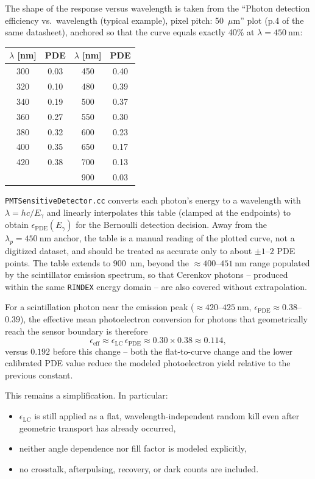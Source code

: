 The shape of the response versus wavelength is taken from the ``Photon
detection efficiency vs.\ wavelength (typical example), pixel pitch:
50~$\mu$m'' plot (p.4 of the same datasheet), anchored so that the curve
equals exactly 40\% at $\lambda = 450~\mathrm{nm}$:
\begin{center}
\begin{tabular}{cccc}
\toprule
$\lambda$ [nm] & PDE & $\lambda$ [nm] & PDE \\
\midrule
300 & 0.03 & 450 & 0.40 \\
320 & 0.10 & 480 & 0.39 \\
340 & 0.19 & 500 & 0.37 \\
360 & 0.27 & 550 & 0.30 \\
380 & 0.32 & 600 & 0.23 \\
400 & 0.35 & 650 & 0.17 \\
420 & 0.38 & 700 & 0.13 \\
& & 900 & 0.03 \\
\bottomrule
\end{tabular}
\end{center}
\texttt{PMTSensitiveDetector.cc} converts each photon's energy to a
wavelength with $\lambda = hc/E_\gamma$ and linearly interpolates this
table (clamped at the endpoints) to obtain $\epsilon_\mathrm{PDE}(E_\gamma)$
for the Bernoulli detection decision. Away from the $\lambda_p=450~\mathrm{nm}$
anchor, the table is a manual reading of the plotted curve, not a digitized
dataset, and should be treated as accurate only to about $\pm 1$--$2$ PDE
points. The table extends to 900~nm, beyond the
$\approx 400$--$451~\mathrm{nm}$ range populated by the scintillator
emission spectrum, so that Cerenkov photons -- produced within the same
\texttt{RINDEX} energy domain -- are also covered without extrapolation.

For a scintillation photon near the emission peak ($\approx 420$--$425~\mathrm{nm}$,
$\epsilon_\mathrm{PDE}\approx 0.38$--$0.39$), the effective mean
photoelectron conversion for photons that geometrically reach the sensor
boundary is therefore
\[
\epsilon_\mathrm{eff} \approx \epsilon_\mathrm{LC}\,\epsilon_\mathrm{PDE}
\approx 0.30 \times 0.38 \approx 0.114,
\]
versus $0.192$ before this change -- both the flat-to-curve change and the
lower calibrated PDE value reduce the modeled photoelectron yield relative
to the previous constant.

This remains a simplification. In particular:
\begin{itemize}
\item \(\epsilon_\mathrm{LC}\) is still applied as a flat, wavelength-independent random kill even after geometric transport has already occurred,
\item neither angle dependence nor fill factor is modeled explicitly,
\item no crosstalk, afterpulsing, recovery, or dark counts are included.
\end{itemize}

